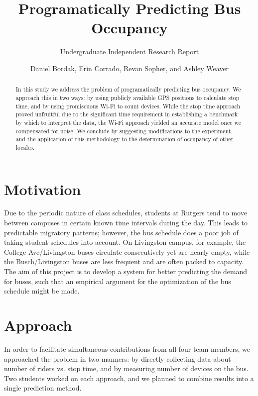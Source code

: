 \documentclass[letterpaper,abstract=on,titlepage=false]{scrreprt}
\begin{document}
\title{Programatically Predicting Bus Occupancy}
\subtitle{Undergraduate Independent Research Report}
\author{Daniel Bordak, Erin Corrado, Revan Sopher, and Ashley Weaver}

\maketitle

\begin{abstract}
In this study we address the problem of programatically predicting bus occupancy.
We approach this in two ways: by using publicly available GPS positions to calculate stop time, and by using promiscuous Wi-Fi to count devices.
While the stop time approach proved unfruitful due to the significant time requirement in establishing a benchmark by which to interpret the data, the Wi-Fi approach yielded an accurate model once we compensated for noise.
We conclude by suggesting modifications to the experiment, and the application of this methodology to the determination of occupancy of other locales.
\end{abstract}

\section*{Motivation}

Due to the periodic nature of class schedules, students at Rutgers tend to move between campuses in certain known time intervals during the day.
This leads to predictable migratory patterns; however, the bus schedule does a poor job of taking student schedules into account.
On Livingston campus, for example, the College Ave/Livingston buses circulate consecutively yet are nearly empty, while the Busch/Livingston buses are less frequent and are often packed to capacity.
The aim of this project is to develop a system for better predicting the demand for buses, such that an empirical argument for the optimization of the bus schedule might be made.

\section*{Approach}

In order to facilitate simultaneous contributions from all four team members, we approached the problem in two manners: by directly collecting data about number of riders vs. stop time, and by measuring number of devices on the bus.
Two students worked on each approach, and we planned to combine results into a single prediction method.
\end{document}
